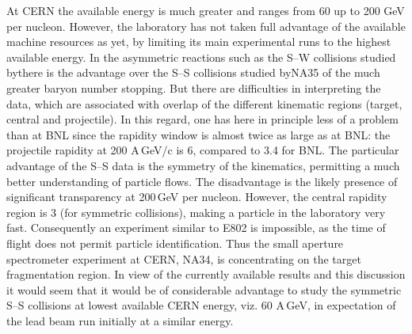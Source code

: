 \begin{mdframed}[linecolor=gray,roundcorner=12pt,backgroundcolor=Dandelion!15,linewidth=1pt,leftmargin=0cm,rightmargin=0cm,topline=true,bottomline=true,skipabove=12pt]
At CERN the available energy is much greater and ranges from 60 up to 200 GeV per nucleon. However, the laboratory has not taken full advantage of the available machine resources as yet, by limiting its main experimental runs to the highest available energy. In the asymmetric reactions such as the S--W collisions studied by\footnotemark[28,29,30]  there is the advantage over the S--S collisions studied by\footnotemark[31,32] NA35 of the much greater baryon number stopping. But there are difficulties in interpreting the data, which are associated with overlap of the different kinematic regions (target, central and projectile). In this regard, one has here in principle less of a problem than at BNL since the rapidity window is almost twice as large as at BNL: the projectile rapidity at 200 A\,GeV/c is 6, compared to 3.4 for BNL. The particular advantage of the S--S data is the symmetry of the kinematics, permitting a much better understanding of particle flows. The disadvantage is the likely presence of significant transparency at 200\,GeV per nucleon. However, the central rapidity region is 3 (for symmetric collisions), making a particle in the laboratory very fast. Consequently an experiment similar to E802 is impossible, as the time of flight does not permit particle identification. Thus the small aperture spectrometer experiment at CERN, NA34, is concentrating on the target fragmentation region. In view of the currently available results and this discussion it would seem that it would be of considerable advantage to study the symmetric S--S collisions at lowest available CERN energy, viz. 60 A\,GeV, in expectation of the lead beam run initially at a similar energy.  


\end{mdframed}

